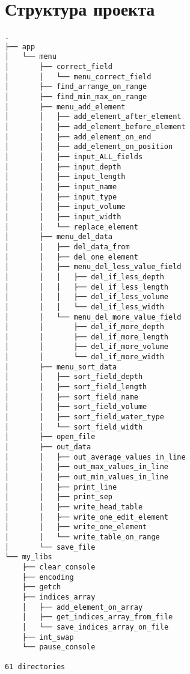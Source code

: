 \documentclass[12pt, a4paper]{article}
\begin{document}
\renewcommand{\contentsname}{Содержание}
\tableofcontents
\newpage


\section{Структура проекта}
{
    \scriptsize

\begin{verbatim}
.
├── app
│   └── menu
│       ├── correct_field
│       │   └── menu_correct_field
│       ├── find_arrange_on_range
│       ├── find_min_max_on_range
│       ├── menu_add_element
│       │   ├── add_element_after_element
│       │   ├── add_element_before_element
│       │   ├── add_element_on_end
│       │   ├── add_element_on_position
│       │   ├── input_ALL_fields
│       │   ├── input_depth
│       │   ├── input_length
│       │   ├── input_name
│       │   ├── input_type
│       │   ├── input_volume
│       │   ├── input_width
│       │   └── replace_element
│       ├── menu_del_data
│       │   ├── del_data_from
│       │   ├── del_one_element
│       │   ├── menu_del_less_value_field
│       │   │   ├── del_if_less_depth
│       │   │   ├── del_if_less_length
│       │   │   ├── del_if_less_volume
│       │   │   └── del_if_less_width
│       │   └── menu_del_more_value_field
│       │       ├── del_if_more_depth
│       │       ├── del_if_more_length
│       │       ├── del_if_more_volume
│       │       └── del_if_more_width
│       ├── menu_sort_data
│       │   ├── sort_field_depth
│       │   ├── sort_field_length
│       │   ├── sort_field_name
│       │   ├── sort_field_volume
│       │   ├── sort_field_water_type
│       │   └── sort_field_width
│       ├── open_file
│       ├── out_data
│       │   ├── out_average_values_in_line
│       │   ├── out_max_values_in_line
│       │   ├── out_min_values_in_line
│       │   ├── print_line
│       │   ├── print_sep
│       │   ├── write_head_table
│       │   ├── write_one_edit_element
│       │   ├── write_one_element
│       │   └── write_table_on_range
│       └── save_file
└── my_libs
    ├── clear_console
    ├── encoding
    ├── getch
    ├── indices_array
    │   ├── add_element_on_array
    │   ├── get_indices_array_from_file
    │   └── save_indices_array_on_file
    ├── int_swap
    └── pause_console

61 directories
\end{verbatim}

}

\newpage
\end{document}
